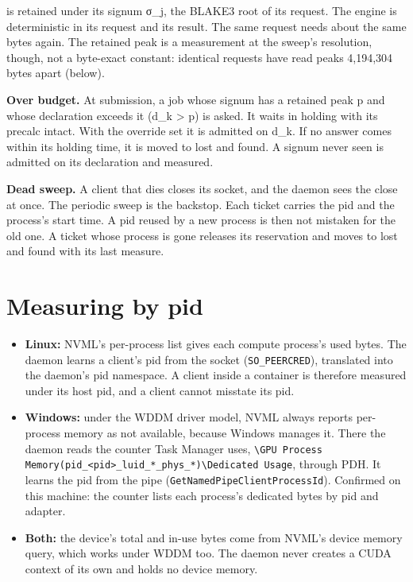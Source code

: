 is retained under its signum σ\_\allowbreak{}j, the BLAKE3 root of its request. The engine is deterministic in its request and its result. The same request needs about the same bytes again. The retained peak is a measurement at the sweep's resolution, though, not a byte-exact constant: identical requests have read peaks 4,194,304 bytes apart (below).

\textbf{Over budget.} At submission, a job whose signum has a retained peak p and whose declaration exceeds it (d\_\allowbreak{}k > p) is asked. It waits in holding with its precalc intact. With the override set it is admitted on d\_\allowbreak{}k. If no answer comes within its holding time, it is moved to lost and found. A signum never seen is admitted on its declaration and measured.

\textbf{Dead sweep.} A client that dies closes its socket, and the daemon sees the close at once. The periodic sweep is the backstop. Each ticket carries the pid and the process's start time. A pid reused by a new process is then not mistaken for the old one. A ticket whose process is gone releases its reservation and moves to lost and found with its last measure.

\section{\texorpdfstring{Measuring by pid}{Measuring by pid}}

\begin{itemize}
\item \textbf{Linux:} NVML's per-process list gives each compute process's used bytes. The daemon learns a client's pid from the socket (\texttt{SO\_\allowbreak{}PEERCRED}), translated into the daemon's pid namespace. A client inside a container is therefore measured under its host pid, and a client cannot misstate its pid.
\item \textbf{Windows:} under the WDDM driver model, NVML always reports per-process memory as not available, because Windows manages it. There the daemon reads the counter Task Manager uses, \texttt{\textbackslash{}GPU Process Memory(pid\_\allowbreak{}<pid>\_\allowbreak{}luid\_\allowbreak{}*\_\allowbreak{}phys\_\allowbreak{}*)\textbackslash{}Dedicated Usage}, through PDH. It learns the pid from the pipe (\texttt{Get\allowbreak{}Named\allowbreak{}Pipe\allowbreak{}Client\allowbreak{}Process\allowbreak{}Id}). Confirmed on this machine: the counter lists each process's dedicated bytes by pid and adapter.
\item \textbf{Both:} the device's total and in-use bytes come from NVML's device memory query, which works under WDDM too. The daemon never creates a CUDA context of its own and holds no device memory.
\end{itemize}

